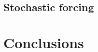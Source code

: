\documentclass[12pt, onecolumn]{revtex4}    %
\begin{document}

\subsection{Stochastic forcing}


\section{Conclusions}



\clearpage



\end{document}
